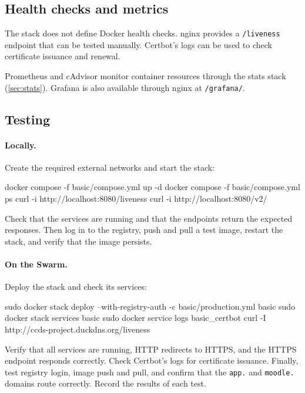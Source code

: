 \subsection{Health checks and metrics}

The stack does not define Docker health checks. nginx provides a
\texttt{/liveness} endpoint that can be tested manually. Certbot's logs
can be used to check certificate issuance and renewal.

Prometheus and cAdvisor monitor container resources through the stats
stack (\cref{sec:stats}). Grafana is also available through nginx
at \texttt{/grafana/}.

\subsection{Testing}


\paragraph{Locally.} Create the required external networks and start
the stack:

\begin{shell}
docker compose -f basic/compose.yml up -d
docker compose -f basic/compose.yml ps
curl -i http://localhost:8080/liveness
curl -i http://localhost:8080/v2/
\end{shell}

Check that the services are running and that the endpoints return the
expected responses. Then log in to the registry, push and pull a test
image, restart the stack, and verify that the image persists.

\paragraph{On the Swarm.} Deploy the stack and check its services:

\begin{shell}
sudo docker stack deploy --with-registry-auth -c basic/production.yml basic
sudo docker stack services basic
sudo docker service logs basic_certbot
curl -I http://ccds-project.duckdns.org/liveness
\end{shell}

Verify that all services are running, HTTP redirects to HTTPS, and the
HTTPS endpoint responds correctly. Check Certbot's logs for certificate
issuance. Finally, test registry login, image push and pull, and confirm
that the \texttt{app.} and \texttt{moodle.} domains route correctly.
Record the results of each test.

